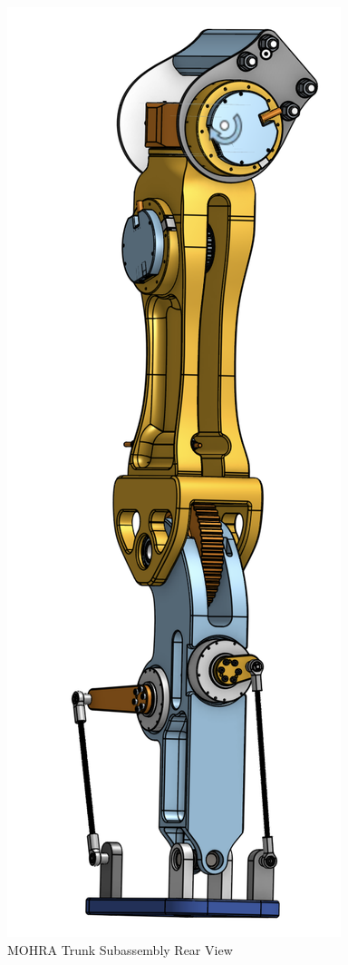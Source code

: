\documentclass{article}
\begin{document}
\begin{figure}[H]
    \centering
    \includegraphics[scale=0.8]{assets/Design Presentation/Leg Rear View.png}
    \caption{MOHRA Trunk Subassembly Rear View}
    \label{fig:enter-label}
\end{figure}
\end{document}
